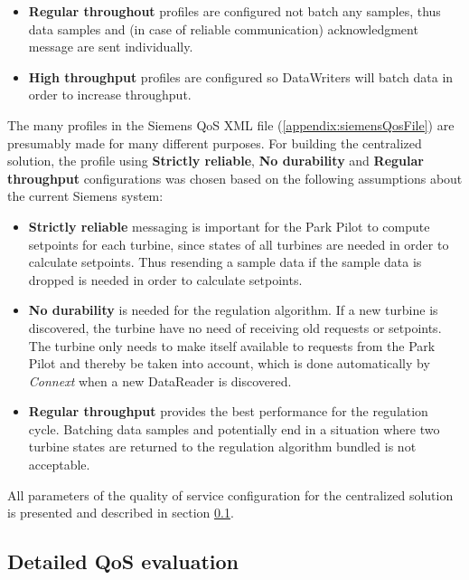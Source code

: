 \begin{itemize}
	\item \textbf{Regular throughout} profiles are configured not batch any samples, thus data samples and (in case of reliable communication) acknowledgment message are sent individually.
	\item \textbf{High throughput} profiles are configured so DataWriters will batch data in order to increase throughput.
\end{itemize}

The many profiles in the Siemens QoS XML file (\cref{appendix:siemensQosFile}) are presumably made for many different purposes. For building the centralized solution, the profile using \textbf{Strictly reliable}, \textbf{No durability} and \textbf{Regular throughput} configurations was chosen based on the following assumptions about the current Siemens system:

\begin{itemize}
	\item \textbf{Strictly reliable} messaging is important for the Park Pilot to compute setpoints for each turbine, since states of all turbines are needed in order to calculate setpoints. Thus resending a sample data if the sample data is dropped is needed in order to calculate setpoints. 
	\item \textbf{No durability} is needed for the regulation algorithm. If a new turbine is discovered, the turbine have no need of receiving old requests or setpoints. The turbine only needs to make itself available to requests from the Park Pilot and thereby be taken into account, which is done automatically by \textit{Connext} when a new DataReader is discovered.  
	\item \textbf{Regular throughput} provides the best performance for the regulation cycle. Batching data samples and potentially end in a situation where two turbine states are returned to the regulation algorithm bundled is not acceptable. 
\end{itemize}

All parameters of the quality of service configuration for the centralized solution is presented and described in section \cref{sec:detailedQoSDesc}.


\subsection{Detailed QoS evaluation} \label{sec:detailedQoSDesc}
\lstset{tabsize=2, language=XML, basicstyle=\small}

